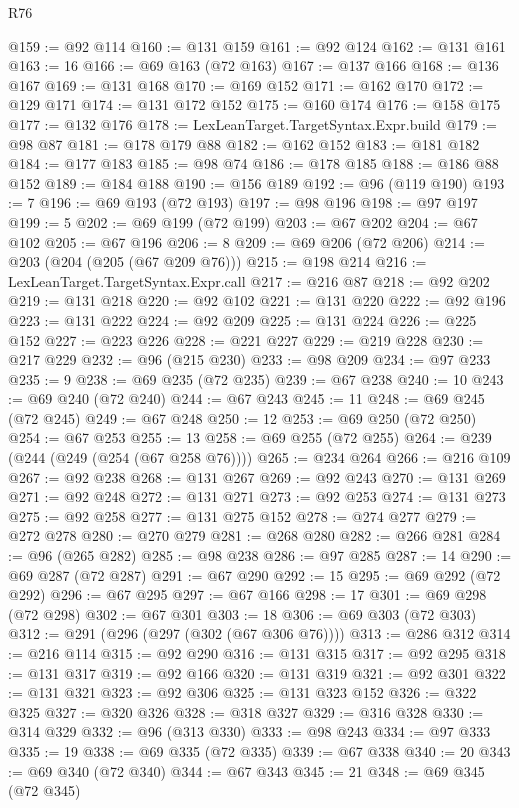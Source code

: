 \begin{lexlean}{R76}
\begin{coremodule}
@159 := @92 @114
@160 := @131 @159
@161 := @92 @124
@162 := @131 @161
@163 := 16
@166 := @69 @163 (@72 @163)
@167 := @137 @166
@168 := @136 @167
@169 := @131 @168
@170 := @169 @152
@171 := @162 @170
@172 := @129 @171
@174 := @131 @172 @152
@175 := @160 @174
@176 := @158 @175
@177 := @132 @176
@178 := LexLeanTarget.TargetSyntax.Expr.build
@179 := @98 @87
@181 := @178 @179 @88
@182 := @162 @152
@183 := @181 @182
@184 := @177 @183
@185 := @98 @74
@186 := @178 @185
@188 := @186 @88 @152
@189 := @184 @188
@190 := @156 @189
@192 := @96 (@119 @190)
@193 := 7
@196 := @69 @193 (@72 @193)
@197 := @98 @196
@198 := @97 @197
@199 := 5
@202 := @69 @199 (@72 @199)
@203 := @67 @202
@204 := @67 @102
@205 := @67 @196
@206 := 8
@209 := @69 @206 (@72 @206)
@214 := @203 (@204 (@205 (@67 @209 @76)))
@215 := @198 @214
@216 := LexLeanTarget.TargetSyntax.Expr.call
@217 := @216 @87
@218 := @92 @202
@219 := @131 @218
@220 := @92 @102
@221 := @131 @220
@222 := @92 @196
@223 := @131 @222
@224 := @92 @209
@225 := @131 @224
@226 := @225 @152
@227 := @223 @226
@228 := @221 @227
@229 := @219 @228
@230 := @217 @229
@232 := @96 (@215 @230)
@233 := @98 @209
@234 := @97 @233
@235 := 9
@238 := @69 @235 (@72 @235)
@239 := @67 @238
@240 := 10
@243 := @69 @240 (@72 @240)
@244 := @67 @243
@245 := 11
@248 := @69 @245 (@72 @245)
@249 := @67 @248
@250 := 12
@253 := @69 @250 (@72 @250)
@254 := @67 @253
@255 := 13
@258 := @69 @255 (@72 @255)
@264 := @239 (@244 (@249 (@254 (@67 @258 @76))))
@265 := @234 @264
@266 := @216 @109
@267 := @92 @238
@268 := @131 @267
@269 := @92 @243
@270 := @131 @269
@271 := @92 @248
@272 := @131 @271
@273 := @92 @253
@274 := @131 @273
@275 := @92 @258
@277 := @131 @275 @152
@278 := @274 @277
@279 := @272 @278
@280 := @270 @279
@281 := @268 @280
@282 := @266 @281
@284 := @96 (@265 @282)
@285 := @98 @238
@286 := @97 @285
@287 := 14
@290 := @69 @287 (@72 @287)
@291 := @67 @290
@292 := 15
@295 := @69 @292 (@72 @292)
@296 := @67 @295
@297 := @67 @166
@298 := 17
@301 := @69 @298 (@72 @298)
@302 := @67 @301
@303 := 18
@306 := @69 @303 (@72 @303)
@312 := @291 (@296 (@297 (@302 (@67 @306 @76))))
@313 := @286 @312
@314 := @216 @114
@315 := @92 @290
@316 := @131 @315
@317 := @92 @295
@318 := @131 @317
@319 := @92 @166
@320 := @131 @319
@321 := @92 @301
@322 := @131 @321
@323 := @92 @306
@325 := @131 @323 @152
@326 := @322 @325
@327 := @320 @326
@328 := @318 @327
@329 := @316 @328
@330 := @314 @329
@332 := @96 (@313 @330)
@333 := @98 @243
@334 := @97 @333
@335 := 19
@338 := @69 @335 (@72 @335)
@339 := @67 @338
@340 := 20
@343 := @69 @340 (@72 @340)
@344 := @67 @343
@345 := 21
@348 := @69 @345 (@72 @345)

\end{coremodule}
\end{lexlean}
